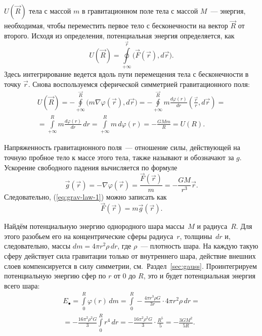  $U(\vec{R})$ тела с массой $m$ в гравитационном поле тела с массой $M$~--- энергия, необходимая, чтобы переместить первое тело с бесконечности на вектор $\vec{R}$ от второго. Исходя из определения, потенциальная энергия определяется, как
\begin{equation}
    U(\vec R) =  \oint\limits_{+\infty}^\vec{r} \big(\vec F( \vec r),d \vec r\big).
\end{equation}
Здесь интегрирование ведется вдоль пути перемещения тела с бесконечности в точку $\vec{r}$. Снова воспользуемся сферической симметрией гравитационного поля:
\begin{multline}
    U(\vec R) 
    = - \oint\limits_{+\infty}^\vec{R} \big(m \nabla \varphi (\vec{r}), d \vec r\big)
    = - \oint\limits_{+\infty}^\vec{R} m \frac{d \varphi(r)}{d r} \left( \frac{\vec r}{r}, d \vec r \right) = \\
    = \int\limits_{+\infty}^R m \frac{d \varphi(r)}{d r} \,d r 
    = \int\limits_{+\infty}^R m \, d \varphi(r) = -\frac{GMm}{R} = U(R).
\end{multline}

Напряженность гравитационного поля~--- отношение силы, действующей на точную пробное тело к массе этого тела, также называют  и обозначают за $g$. Ускорение свободного падения вычисляется по формуле
\begin{equation}
	\vec g(\vec r) = -\nabla \varphi(\vec r) = \frac{\vec F( \vec r)}{m} = - \frac{GM}{r^3} \vec r.
	\label{eq:g}
\end{equation} 
Следовательно, (\ref{eq:grav-law-1}) можно записать как
\begin{equation}
	\vec F (\vec r) = m \vec g(\vec r).
\end{equation}

Найдём потенциальную энергию однородного шара массы~$M$ и радиуса~$R$. Для этого разобьем его на концентрические сферы радиуса~$r$, толщины~$dr$ и, следовательно, массы $dm = 4 \pi r^2 \rho \, dr$, где $\rho$~--- плотность шара. На каждую такую сферу действует сила гравитации только от внутреннего шара, действие внешних слоев компенсируется в силу симметрии, см.~Раздел~\ref{sec:gauss}. Проинтегрируем потенциальную энергию сфер по $r$ от 0 до $R$, это и будет потенциальная энергия всего шара:
\begin{multline}
    E_\bullet 
        = \int\limits_0^R \varphi(r) \, dm 
        = \int\limits_0^R -\frac{4 \pi r^3 \rho G}{3 r} \cdot 4 \pi r^2 \rho \, dr =\\
        = -\frac{16\pi^2 \rho^2 G}{3} \int\limits_0^R r^4 \, dr 
        = -\frac{16 \pi^2 \rho^2 G}{3} \cdot \frac{R^5}{5} 
        = - \frac{3 G M^2}{5R}.
\end{multline}

